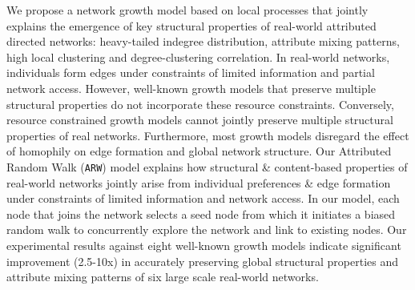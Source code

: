 
We propose a network growth model based on local processes that jointly explains the
emergence of key structural properties of real-world attributed directed networks:
heavy-tailed indegree distribution, attribute mixing patterns, high local
clustering and degree-clustering correlation.
In real-world networks, individuals form edges
under constraints of limited information and partial network access. However,
well-known growth models that preserve multiple structural properties do not
incorporate these resource constraints. Conversely, resource constrained growth models
cannot jointly preserve multiple structural
properties of real networks. Furthermore, most growth models disregard
the effect of homophily on edge formation and global network structure.
Our Attributed Random Walk (\texttt{ARW}) model explains how structural \&
content-based properties of real-world networks jointly arise from individual
preferences \& edge formation under constraints of limited information and network access.
In our model, each node that joins the network selects a seed node from which it initiates a
biased random walk to concurrently explore the network and link to existing nodes.
Our experimental results against eight well-known growth models
indicate significant improvement (2.5-10x) in accurately preserving global
structural properties and attribute mixing patterns of
six large scale real-world networks.